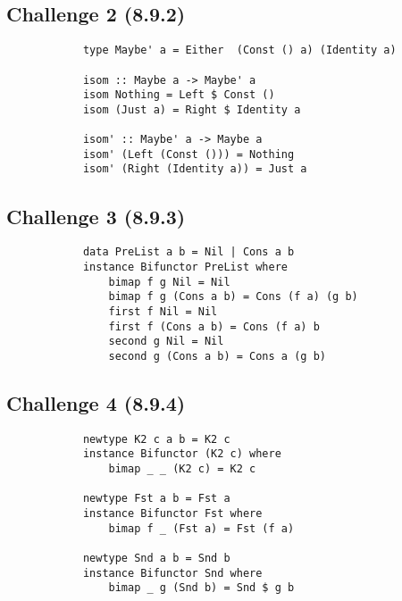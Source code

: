 \documentclass[11pt]{article}
\begin{document}
    \subsection*{Challenge 2 (8.9.2)}

        \begin{verbatim}
            type Maybe' a = Either  (Const () a) (Identity a)

            isom :: Maybe a -> Maybe' a
            isom Nothing = Left $ Const ()
            isom (Just a) = Right $ Identity a

            isom' :: Maybe' a -> Maybe a
            isom' (Left (Const ())) = Nothing
            isom' (Right (Identity a)) = Just a
        \end{verbatim}

    \subsection*{Challenge 3 (8.9.3)}

        \begin{verbatim}
            data PreList a b = Nil | Cons a b
            instance Bifunctor PreList where
                bimap f g Nil = Nil
                bimap f g (Cons a b) = Cons (f a) (g b)
                first f Nil = Nil
                first f (Cons a b) = Cons (f a) b
                second g Nil = Nil
                second g (Cons a b) = Cons a (g b)
        \end{verbatim}

    \subsection*{Challenge 4 (8.9.4)}

        \begin{verbatim}
            newtype K2 c a b = K2 c
            instance Bifunctor (K2 c) where 
                bimap _ _ (K2 c) = K2 c

            newtype Fst a b = Fst a
            instance Bifunctor Fst where
                bimap f _ (Fst a) = Fst (f a)

            newtype Snd a b = Snd b
            instance Bifunctor Snd where
                bimap _ g (Snd b) = Snd $ g b
        \end{verbatim}
\end{document}
